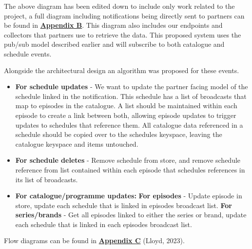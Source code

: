     The above diagram has been edited down to include only work related to the project, a full diagram including notifications being directly sent to partners can 
    be found in \hyperref[sec:AppendixB]{\textbf{Appendix B}}. This diagram also includes our endpoints and collectors that partners use to 
    retrieve the data. This proposed system uses the pub/sub model described earlier and will subscribe to both catalogue and schedule events.

    Alongside the architectural design an algorithm was proposed for these events.
    \begin{itemize}
      \item \textbf{For schedule updates} - We want to update the partner facing model of the schedule linked in the notification. This schedule has a 
      list of broadcasts that map to episodes in the catalogue. A list should be maintained within each episode to create a link between both, allowing episode 
      updates to trigger updates to schedules that reference them. All catalogue data referenced in a schedule should be copied over to the schedules keyspace,
      leaving the catalogue keyspace and items untouched.
      \item \textbf{For schedule deletes} - Remove schedule from store, and remove schedule reference from list contained within each episode that schedules 
      references in its list of broadcasts.
      \item \textbf{For catalogue/programme updates:}
        \subitem \textbf{For episodes} - Update episode in store, update each schedule that is linked in episodes broadcast list.
        \subitem \textbf{For series/brands} - Get all episodes linked to either the series or brand, update each schedule that is linked in each episodes 
        broadcast list.
    \end{itemize}

    Flow diagrams can be found in \hyperref[sec:AppendixC]{\textbf{Appendix C}} (Lloyd, 2023).
\newpage
